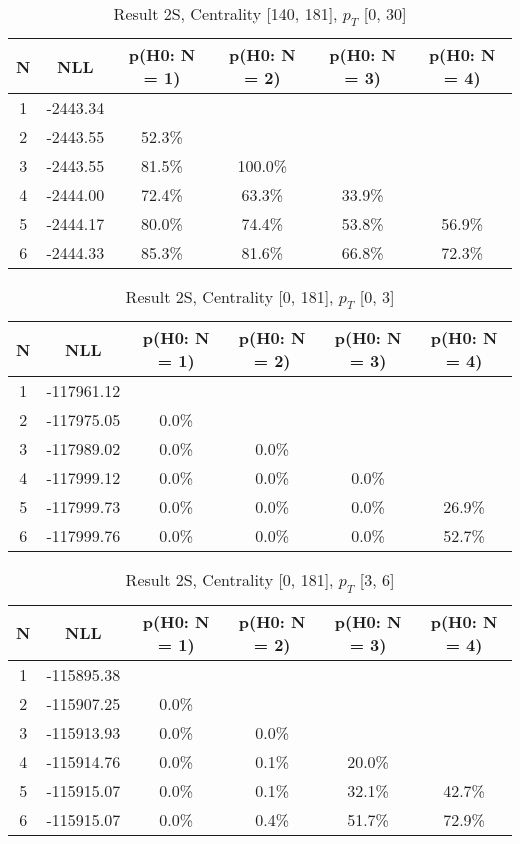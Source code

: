\begin{table}[htb]
	\begin{center}
	\caption{Result 2S, Centrality [140, 181], $p_{T}$ [0, 30]
}
{\footnotesize\renewcommand{\arraystretch}{1.4}
		\begin{tabular}{cc||cccc}
			N & NLL & p(H0: N = 1) & p(H0: N = 2) & p(H0: N = 3) & p(H0: N = 4)\\ 
		\hline
1 & -2443.34 & & & & \\
2 & -2443.55 & 52.3\% & & & \\
3 & -2443.55 & 81.5\% & 100.0\% & & \\
4 & -2444.00 & 72.4\% & 63.3\% & 33.9\% & \\
5 & -2444.17 & 80.0\% & 74.4\% & 53.8\% & 56.9\% \\
6 & -2444.33 & 85.3\% & 81.6\% & 66.8\% & 72.3\% \\
	\end{tabular}
		\label{tab:lab}
	}
	\end{center}\end{table}

\begin{table}[htb]
	\begin{center}
	\caption{Result 2S, Centrality [0, 181], $p_{T}$ [0, 3]
}
{\footnotesize\renewcommand{\arraystretch}{1.4}
		\begin{tabular}{cc||cccc}
			N & NLL & p(H0: N = 1) & p(H0: N = 2) & p(H0: N = 3) & p(H0: N = 4)\\ 
		\hline
1 & -117961.12 & & & & \\
2 & -117975.05 & 0.0\% & & & \\
3 & -117989.02 & 0.0\% & 0.0\% & & \\
4 & -117999.12 & 0.0\% & 0.0\% & 0.0\% & \\
5 & -117999.73 & 0.0\% & 0.0\% & 0.0\% & 26.9\% \\
6 & -117999.76 & 0.0\% & 0.0\% & 0.0\% & 52.7\% \\
	\end{tabular}
		\label{tab:lab}
	}
	\end{center}\end{table}

\begin{table}[htb]
	\begin{center}
	\caption{Result 2S, Centrality [0, 181], $p_{T}$ [3, 6]
}
{\footnotesize\renewcommand{\arraystretch}{1.4}
		\begin{tabular}{cc||cccc}
			N & NLL & p(H0: N = 1) & p(H0: N = 2) & p(H0: N = 3) & p(H0: N = 4)\\ 
		\hline
1 & -115895.38 & & & & \\
2 & -115907.25 & 0.0\% & & & \\
3 & -115913.93 & 0.0\% & 0.0\% & & \\
4 & -115914.76 & 0.0\% & 0.1\% & 20.0\% & \\
5 & -115915.07 & 0.0\% & 0.1\% & 32.1\% & 42.7\% \\
6 & -115915.07 & 0.0\% & 0.4\% & 51.7\% & 72.9\% \\
	\end{tabular}
		\label{tab:lab}
	}
	\end{center}\end{table}

